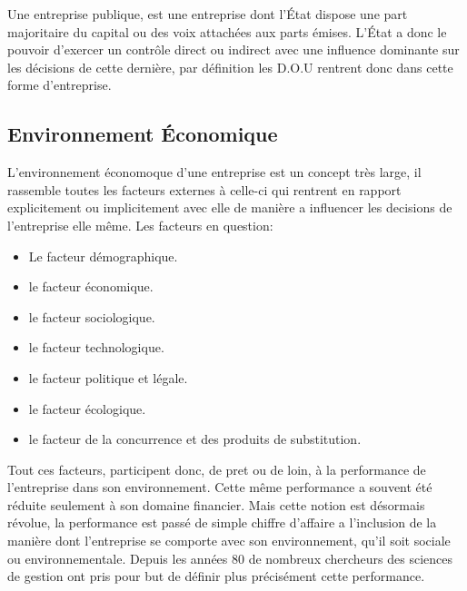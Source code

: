         Une entreprise publique, est une entreprise dont l'État dispose une part majoritaire du capital ou des voix attachées aux parts émises. L'État a donc le pouvoir d'exercer un contrôle direct ou indirect avec une influence dominante sur les décisions de cette dernière\cite{def-entreprise-pub}, par définition les \acs{D.O.U} rentrent donc dans cette forme d'entreprise.\\
        
    \subsection{Environnement Économique \cite{env-entreprise}}
        L'environnement économoque d'une entreprise est un concept très large, il rassemble toutes les facteurs externes à celle-ci qui rentrent en rapport explicitement ou implicitement avec elle de manière a influencer les decisions de l'entreprise elle même. Les facteurs en question:\\

        \begin{itemize}
            \item Le facteur démographique.
            \item le facteur économique.
            \item le facteur sociologique.
            \item le facteur technologique.
            \item le facteur politique et légale.
            \item le facteur écologique.
            \item le facteur de la concurrence et des produits de substitution.\\
        \end{itemize}

        Tout ces facteurs, participent donc, de pret ou de loin, à la performance de l'entreprise dans son environnement. Cette même performance a souvent été réduite seulement à son domaine financier. Mais cette notion est désormais révolue, la performance est passé de simple chiffre d'affaire a l'inclusion de la manière dont l'entreprise se comporte avec son environnement, qu'il soit sociale ou environnementale. Depuis les années 80 de nombreux chercheurs des sciences de gestion ont pris pour but de définir plus précisément cette performance\cite{perf-entreprise}.\\


